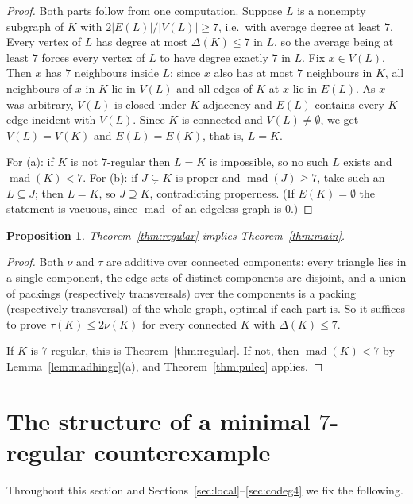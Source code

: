 \documentclass[11pt,a4paper]{amsart}
\theoremstyle{plain}
\newtheorem{proposition}[theorem]{Proposition}
\theoremstyle{definition}
\newcommand{\mad}{\operatorname{mad}}
\begin{document}
\begin{proof}
Both parts follow from one computation. Suppose $L$ is a nonempty subgraph of
$K$ with $2|E(L)|/|V(L)|\ge 7$, i.e.\ with average degree at least $7$. Every
vertex of $L$ has degree at most $\Delta(K)\le 7$ in $L$, so the average being
at least $7$ forces every vertex of $L$ to have degree exactly $7$ in $L$.
Fix $x\in V(L)$. Then $x$ has $7$ neighbours inside $L$; since $x$ also has at
most $7$ neighbours in $K$, all neighbours of $x$ in $K$ lie in $V(L)$ and all
edges of $K$ at $x$ lie in $E(L)$. As $x$ was arbitrary, $V(L)$ is closed
under $K$-adjacency and $E(L)$ contains every $K$-edge incident with $V(L)$.
Since $K$ is connected and $V(L)\neq\emptyset$, we get $V(L)=V(K)$ and
$E(L)=E(K)$, that is, $L=K$.

For (a): if $K$ is not $7$-regular then $L=K$ is impossible, so no such $L$
exists and $\mad(K)<7$. For (b): if $J\subsetneq K$ is proper and
$\mad(J)\ge 7$, take such an $L\subseteq J$; then $L=K$, so $J\supseteq K$,
contradicting properness. (If $E(K)=\emptyset$ the statement is vacuous, since
$\mad$ of an edgeless graph is $0$.)
\end{proof}

\begin{proposition}\label{prop:AtoAprime}
Theorem~\ref{thm:regular} implies Theorem~\ref{thm:main}.
\end{proposition}

\begin{proof}
Both $\nu$ and $\tau$ are additive over connected components: every triangle
lies in a single component, the edge sets of distinct components are disjoint,
and a union of packings (respectively transversals) over the components is a
packing (respectively transversal) of the whole graph, optimal if each part
is. So it suffices to prove $\tau(K)\le 2\nu(K)$ for every connected $K$ with
$\Delta(K)\le 7$.

If $K$ is $7$-regular, this is Theorem~\ref{thm:regular}. If not, then
$\mad(K)<7$ by Lemma~\ref{lem:madhinge}(a), and Theorem~\ref{thm:puleo}
applies.
\end{proof}

\section{The structure of a minimal \texorpdfstring{$7$}{7}-regular counterexample}
\label{sec:minimal}

Throughout this section and Sections~\ref{sec:local}--\ref{sec:codeg4} we fix
the following.
\end{document}
